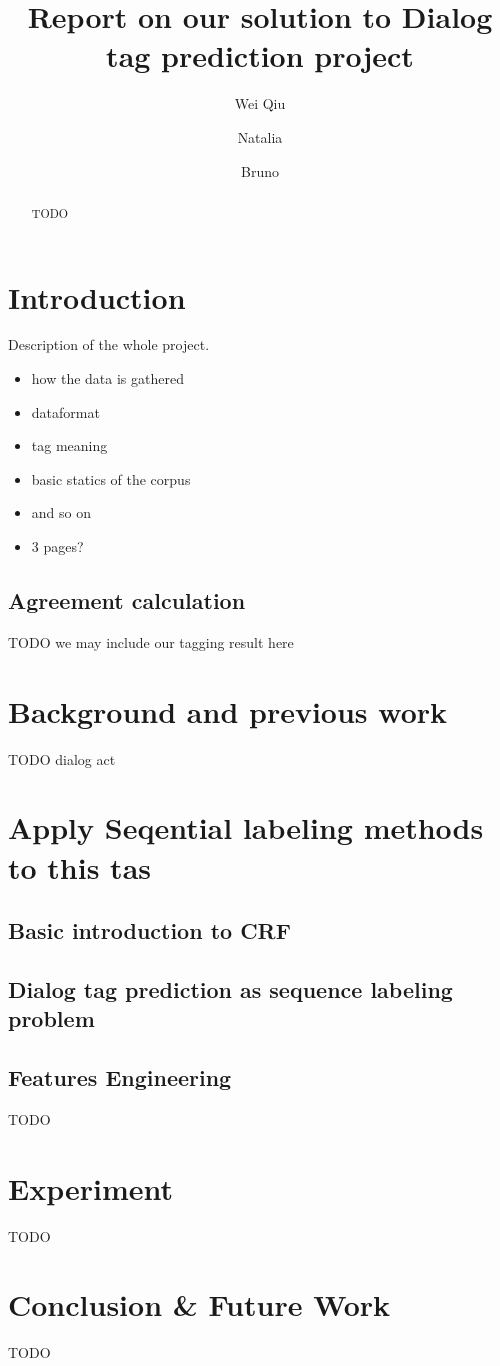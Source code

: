 \documentclass[a4paper]{article}
\title{Report on our solution to Dialog tag prediction project}
\author{Wei Qiu \and Natalia \and Bruno}
\date{}
\begin{document}
\maketitle
\begin{abstract}
TODO
\end{abstract}
\section{Introduction}
Description of the whole project.
\begin{itemize}
\item how the data is gathered
\item dataformat
\item tag meaning
\item basic statics of the corpus
\item and so on
\item 3 pages?
\end{itemize}
\subsection{Agreement calculation}
TODO we may include our tagging result here
\section{Background and previous work}
TODO dialog act
\section{Apply Seqential labeling methods to this tas}
\subsection{Basic introduction to CRF}
\subsection{Dialog tag prediction as sequence labeling problem}
\subsection{Features Engineering}
TODO
\section{Experiment}
TODO
\section{Conclusion \& Future Work}
TODO
%
\printbibliography
\end{document}
